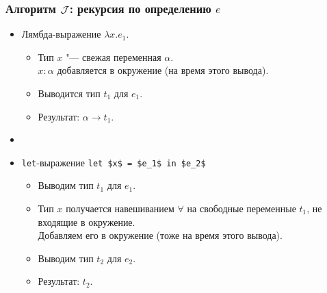 \documentclass[11pt]{beamer}
\begin{document}
\begin{frame}[fragile]
  \frametitle{Алгоритм $\mathcal{J}$: рекурсия по определению $e$}
  \begin{itemize}
    \item Лямбда-выражение $\lambda x.e_1$.
          \pause
          \begin{itemize}
            \item Тип $x$ "--- свежая переменная $\alpha$. \\ $x : \alpha$ добавляется в окружение (на время этого вывода).
            \item Выводится тип $t_1$ для $e_1$.
            \item Результат: \pause $\alpha \to t_1$.
          \end{itemize}
          \pause
    \item[]
    \item \lstinline|let|-выражение \lstinline[mathescape]|let $x$ = $e_1$ in $e_2$|
          \pause
          \begin{itemize}
            \item Выводим тип $t_1$ для $e_1$.
            \item Тип $x$ получается навешиванием $\forall$ на свободные переменные $t_1$, не входящие в окружение.
                  \\ Добавляем его в окружение \pause (тоже на время этого вывода).
            \item Выводим тип $t_2$ для $e_2$.
            \item Результат: \pause $t_2$.
          \end{itemize}
  \end{itemize}
\end{frame}

\end{document}
